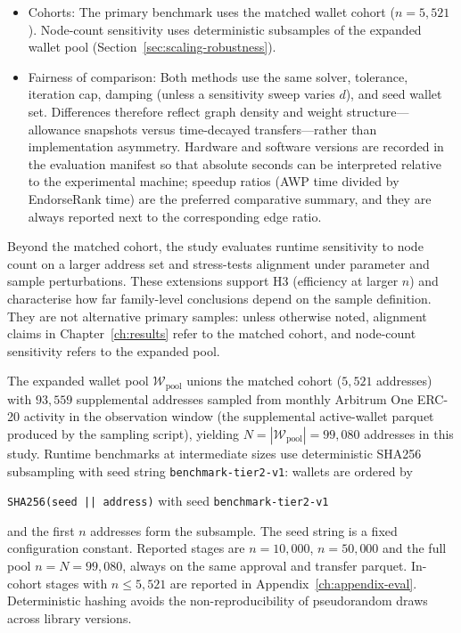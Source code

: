 \begin{itemize}
\item Cohorts: The primary benchmark uses the matched wallet cohort ($n=5{,}521$). Node-count sensitivity uses deterministic subsamples of the expanded wallet pool (Section~\ref{sec:scaling-robustness}).

\item Fairness of comparison: Both methods use the same solver, tolerance, iteration cap, damping (unless a sensitivity sweep varies $d$), and seed wallet set. Differences therefore reflect graph density and weight structure---allowance snapshots versus time-decayed transfers---rather than implementation asymmetry. Hardware and software versions are recorded in the evaluation manifest so that absolute seconds can be interpreted relative to the experimental machine; speedup ratios (AWP time divided by EndorseRank time) are the preferred comparative summary, and they are always reported next to the corresponding edge ratio.

\end{itemize}


Beyond the matched cohort, the study evaluates runtime sensitivity to node count on a larger address set and stress-tests alignment under parameter and sample perturbations. These extensions support H3 (efficiency at larger $n$) and characterise how far family-level conclusions depend on the sample definition. They are not alternative primary samples: unless otherwise noted, alignment claims in Chapter~\ref{ch:results} refer to the matched cohort, and node-count sensitivity refers to the expanded pool.


The expanded wallet pool $\mathcal{W}_{\mathrm{pool}}$ unions the matched cohort ($5{,}521$ addresses) with $93{,}559$ supplemental addresses sampled from monthly Arbitrum One ERC-20 activity in the observation window (the supplemental active-wallet parquet produced by the sampling script), yielding $N=|\mathcal{W}_{\mathrm{pool}}|=99{,}080$ addresses in this study. Runtime benchmarks at intermediate sizes use deterministic SHA256 subsampling with seed string \texttt{benchmark-tier2-v1}: wallets are ordered by
\begin{center}
\texttt{SHA256(seed || address)} with seed \texttt{benchmark-tier2-v1}
\end{center}
and the first $n$ addresses form the subsample. The seed string is a fixed configuration constant. Reported stages are $n=10{,}000$, $n=50{,}000$ and the full pool $n=N=99{,}080$, always on the same approval and transfer parquet. In-cohort stages with $n\le 5{,}521$ are reported in Appendix~\ref{ch:appendix-eval}. Deterministic hashing avoids the non-reproducibility of pseudorandom draws across library versions.

